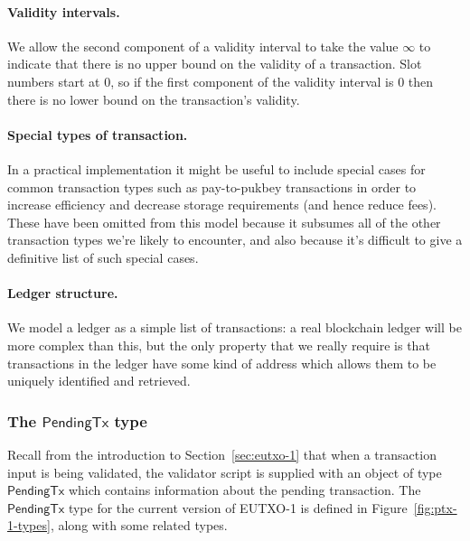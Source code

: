 \documentclass[a4paper]{article}
\newcommand{\s}{\textsf}  %
\theoremstyle{definition}  %
\newcommand{\ptx}{\ensuremath{\s{PendingTx}}}
\begin{document}
\paragraph{Validity intervals.} We allow the second component of a
validity interval to take the value $\infty$ to indicate that there is
no upper bound on the validity of a transaction.  Slot numbers start
at 0, so if the first component of the validity interval is 0
then there is no lower bound on the transaction's validity.

\paragraph{Special types of transaction.} In a practical
implementation it might be useful to include special cases for common
transaction types such as pay-to-pukbey transactions in order to
increase efficiency and decrease storage requirements (and hence
reduce fees).  These have been omitted from this model because it
subsumes all of the other transaction types we're likely to encounter,
and also because it's difficult to give a definitive list of such
special cases.

\paragraph{Ledger structure.} We model a ledger as a simple
list of transactions: a real blockchain ledger will be more complex
than this, but the only property that we really require is that
transactions in the ledger have some kind of address which allows them
to be uniquely identified and retrieved.

\subsubsection{The $\ptx$ type}
\label{sec:pendingtx}
Recall from the introduction to Section~\ref{sec:eutxo-1} that when a
transaction input is being validated, the validator script is supplied
with an object of type $\ptx$ which contains information about the
pending transaction.  The $\ptx$ type for the current version of
EUTXO-1 is defined in Figure~\ref{fig:ptx-1-types}, along with some
related types.
\end{document}
